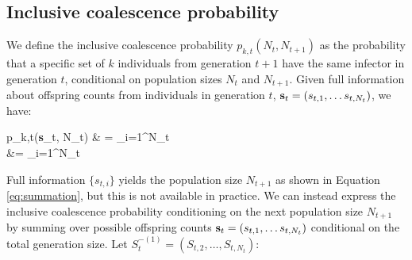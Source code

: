 \documentclass{article}
\let\oldalign\align
\let\oldendalign\endalign
\renewenvironment{align}{\linenomathNonumbers\oldalign}{\oldendalign\endlinenomath}
\renewcommand{\eqref}[1]{\ref{#1}}
\begin{document}
\subsection{Inclusive coalescence probability}

We define the inclusive coalescence probability $p_{k,t}(N_t, N_{t+1})$ as the probability that a specific set of $k$ individuals from generation $t+1$ have the same infector in generation $t$, conditional on population sizes $N_t$ and $N_{t+1}$.
%
Given full information about offspring counts from individuals in generation $t$, ${\bf s}_t = (s_{t,1}, \dots s_{t, N_t})$, we have:

{\allowdisplaybreaks
	\begin{align}
		p_{k,t}({\bf s}_t, N_t)
			& = \sum_{i=1}^{N_t}  \nonumber\\
			 &= \sum_{i=1}^{N_t}   %
	\end{align}
}

Full information $\{s_{t,i}\}$ yields the population size $N_{t+1}$ as shown in Equation \eqref{eq:summation}, 
but this is not available in practice.
We can instead express the inclusive coalescence probability conditioning on the next population size $N_{t+1}$ by summing over possible offspring counts ${\bf s}_t = (s_{t,1}, \dots s_{t, N_t})$ conditional on the total generation size.
Let $S_t^{-(1)} = (S_{t,2}, \dots, S_{t, N_t})$:
\end{document}
